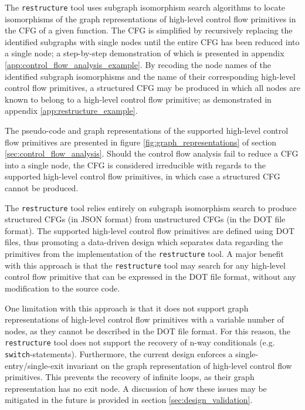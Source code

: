 The \texttt{restructure} tool uses subgraph isomorphism search algorithms to locate isomorphisms of the graph representations of high-level control flow primitives in the CFG of a given function. The CFG is simplified by recursively replacing the identified subgraphs with single nodes until the entire CFG has been reduced into a single node; a step-by-step demonstration of which is presented in appendix \ref{app:control_flow_analysis_example}. By recoding the node names of the identified subgraph isomorphisms and the name of their corresponding high-level control flow primitives, a structured CFG may be produced in which all nodes are known to belong to a high-level control flow primitive; as demonstrated in appendix \ref{app:restructure_example}.

The pseudo-code and graph representations of the supported high-level control flow primitives are presented in figure \ref{fig:graph_representations} of section \ref{sec:control_flow_analysis}. Should the control flow analysis fail to reduce a CFG into a single node, the CFG is considered irreducible with regards to the supported high-level control flow primitives, in which case a structured CFG cannot be produced.

The \texttt{restructure} tool relies entirely on subgraph isomorphism search to produce structured CFGs (in JSON format) from unstructured CFGs (in the DOT file format). The supported high-level control flow primitives are defined using DOT files, thus promoting a data-driven design which separates data regarding the primitives from the implementation of the \texttt{restructure} tool. A major benefit with this approach is that the \texttt{restructure} tool may search for any high-level control flow primitive that can be expressed in the DOT file format, without any modification to the source code.

One limitation with this approach is that it does not support graph representations of high-level control flow primitives with a variable number of nodes, as they cannot be described in the DOT file format. For this reason, the \texttt{restructure} tool does not support the recovery of n-way conditionals (e.g. \texttt{switch}-statements). Furthermore, the current design enforces a single-entry/single-exit invariant on the graph representation of high-level control flow primitives. This prevents the recovery of infinite loops, as their graph representation has no exit node. A discussion of how these issues may be mitigated in the future is provided in section \ref{sec:design_validation}.
